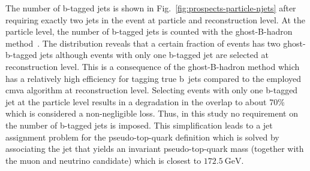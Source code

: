 The number of b-tagged jets is shown in Fig.~\ref{fig:prospects-particle-njets} after requiring exactly two jets in the event at particle and reconstruction level. 
At the particle level, the number of b-tagged jets is counted with the ghost-B-hadron method~\cite{Cacciari:2008gn}. The distribution reveals that a certain fraction of events has two ghost-b-tagged jets although events with only one b-tagged jet are selected at reconstruction level. This is a consequence of the ghost-B-hadron method which has a relatively high efficiency for tagging true b~jets compared to the employed \gls{cmva} algorithm at reconstruction level. Selecting events with only one b-tagged jet at the particle level results in a degradation in the overlap to about 70\% which is considered a non-negligible loss. Thus, in this study no requirement on the number of b-tagged jets is imposed. This simplification leads to a jet assignment problem for the pseudo-top-quark definition which is solved by associating the jet that yields an invariant pseudo-top-quark mass (together with the muon and neutrino candidate) which is closest to $172.5~\mathrm{GeV}$.


